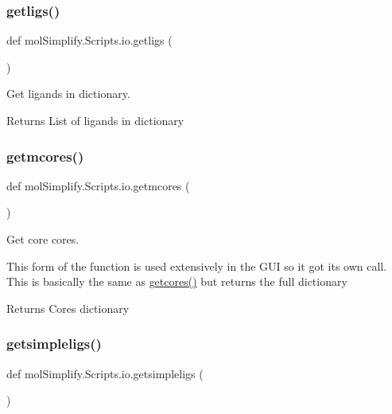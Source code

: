 \subsubsection{\texorpdfstring{getligs()}{getligs()}}
{\footnotesize\ttfamily def mol\+Simplify.\+Scripts.\+io.\+getligs (\begin{DoxyParamCaption}{ }\end{DoxyParamCaption})}



Get ligands in dictionary. 

\begin{DoxyReturn}{Returns}
List of ligands in dictionary 
\end{DoxyReturn}
\mbox{\label{namespacemolSimplify_1_1Scripts_1_1io_a1d772b9f3c7f695c106e60ff2564f6a5}} 
\subsubsection{\texorpdfstring{getmcores()}{getmcores()}}
{\footnotesize\ttfamily def mol\+Simplify.\+Scripts.\+io.\+getmcores (\begin{DoxyParamCaption}{ }\end{DoxyParamCaption})}



Get core cores. 

This form of the function is used extensively in the G\+UI so it got it\textquotesingle{}s own call. This is basically the same as \hyperlink{namespacemolSimplify_1_1Scripts_1_1io_ac64e78f365020a88b30902f3b6aba5d2}{getcores()} but returns the full dictionary \begin{DoxyReturn}{Returns}
Cores dictionary 
\end{DoxyReturn}
\mbox{\label{namespacemolSimplify_1_1Scripts_1_1io_a78464c05e4823eb46028f344815c80c5}} 
\subsubsection{\texorpdfstring{getsimpleligs()}{getsimpleligs()}}
{\footnotesize\ttfamily def mol\+Simplify.\+Scripts.\+io.\+getsimpleligs (\begin{DoxyParamCaption}{ }\end{DoxyParamCaption})}



